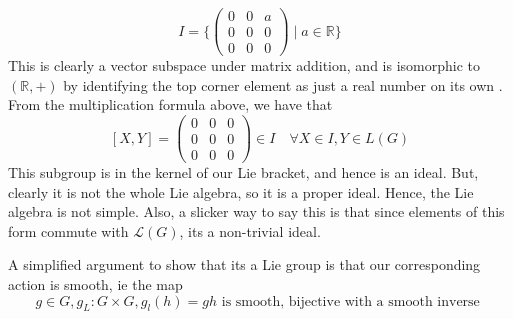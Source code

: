 \[ 
I = \bigg \{  \begin{pmatrix} 0  & 0 & a \\ 0 & 0 & 0 \\ 0 & 0 & 0 \end{pmatrix} \mid a \in \mathbb{ R} \bigg \} 
\] This is clearly a vector subspace under matrix addition, and is isomorphic 
to $ ( \mathbb { R } , + ) $ by identifying the top corner element as just a real number on its own
. From the multiplication formula above, we have that 
\[ [ X, Y ]  = \begin{pmatrix} 0 & 0 & 0 \\ 0 & 0 & 0 \\ 0 & 0 & 0 \end{pmatrix} \in I  \quad \forall X \in I, Y \in L ( G ) \] 
This subgroup is in the kernel of our Lie bracket, and hence is an ideal. But, clearly it is not the whole Lie algebra,
so it is a proper ideal. Hence, the Lie algebra is not simple. 
Also, a slicker way to say this
is that since elements of this form commute with $ \mathcal{ L } ( G ) $, 
its a non-trivial ideal. 

A simplified argument to show that 
its a Lie group is that our corresponding 
action is smooth, ie the map 
\[
 g \in G, g_L : G \times G, g_l ( h ) = gh \text{ is smooth, bijective with a smooth inverse }
\] 
\pagebreak 
